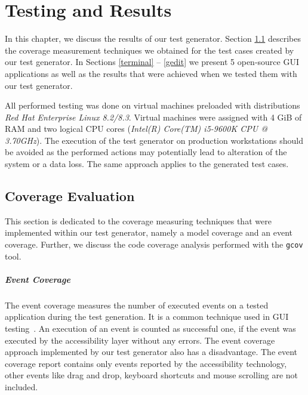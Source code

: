 

\chapter{Testing and Results}\label{chapter_4}
In this chapter, we discuss the results of our test generator. Section \ref{coverage} describes the coverage measurement techniques we obtained for the test cases created by our test generator.  In Sections \ref{terminal} -- \ref{gedit} we present 5 open-source GUI applications as well as the results that were achieved when we tested them with our test generator.

All performed testing was done on virtual machines preloaded with distributions \textit{Red Hat Enterprise Linux 8.2/8.3}. Virtual machines were assigned with 4 GiB of RAM and two logical CPU cores (\textit{Intel(R) Core(TM) i5-9600K CPU @ 3.70GHz}). The execution of the test generator on production workstations should be avoided as the performed actions may potentially lead to alteration of the system or a data loss. The same approach applies to the generated test cases. 

\section{Coverage Evaluation}\label{coverage}
This section is dedicated to the coverage measuring techniques that were implemented within our test generator, namely a model coverage and an event coverage. Further, we discuss the code coverage analysis performed with the \verb|gcov| tool.

\paragraph{Event Coverage} The event coverage measures the number of executed events on a tested application during the test generation. It is a common technique used in GUI testing~\cite{NguyenBao2014Gait}. An execution of an event is counted as successful one, if the event was executed by the accessibility layer without any errors. The event coverage approach implemented by our test generator also has a disadvantage. The event coverage report contains only events reported by the accessibility technology, other events like drag and drop, keyboard shortcuts and mouse scrolling are not included.

